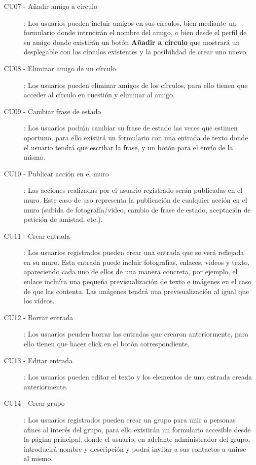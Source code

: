 \documentclass[12pt, a4paper, titlepage]{article}
\begin{document}
\begin{description}
	\item [CU07 - Añadir amigo a círculo]: Los usuarios pueden incluir amigos en sus círculos, bien mediante un formulario donde intrucirán el nombre del amigo, o bien desde el perfil de su amigo donde existirán un botón \textbf{Añadir a círculo} que mostrará un desplegable con los círculos existentes y la posibilidad de crear uno nuevo.
	
	\item [CU08 - Eliminar amigo de un círculo]: Los usuarios pueden eliminar amigos de los círculos, para ello tienen que acceder al círculo en cuestión y eliminar al amigo.
	
	\item [CU09 - Cambiar frase de estado]: Los usuarios podrán cambiar su frase de estado las veces que estimen oportuno, para ello existirá un formulario con una entrada de texto donde el usuario tendrá que escribar la frase, y un botón para el envío de la misma.
	
	\item [CU10 - Publicar acción en el muro]: Las acciones realizadas por el usuario registrado serán publicadas en el muro. Este caso de uso representa la publicación de cualquier acción en el muro (subida de fotografía/video, cambio de frase de estado, aceptación de petición de amistad, etc.).
	
	\item [CU11 - Crear entrada]: Los usuarios registrados pueden crear una entrada que se verá reflejada en su muro. Esta entrada puede incluir fotografías, enlaces, videos y texto, apareciendo cada uno de ellos de una manera concreta, por ejemplo, el enlace incluíra una pequeña previsualización de texto e imágenes en el caso de que las contenta. Las imágenes tendrá una previsualización al igual que los vídeos.
	
	\item [CU12 - Borrar entrada]: Los usuarios peuden borrar las entradas que crearon anteriormente, para ello tienen que hacer click en el botón correspondiente.
	
	\item [CU13 - Editar entrada]: Los usuarios pueden editar el texto y los elementos de una entrada creada anteriormente.
	
	\item [CU14 - Crear grupo]: Los usuarios registrados pueden crear un grupo para unir a personas afines al interés del grupo, para ello existirán un formulario accesible desde la página principal, donde el usuario, en adelante administrador del grupo, introducirá nombre y descripción y podrá invitar a sus contactos a unirse al mismo.
	

\end{description}
\end{document}
